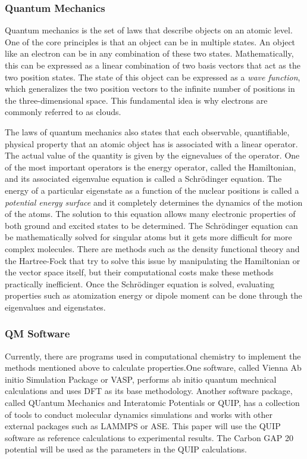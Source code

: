 \documentclass[12pt]{scrartcl}
\begin{document}
\subsubsection{Quantum Mechanics}
Quantum mechanics is the set of laws that describe objects on an atomic level. One of the core
principles is that an object can be in multiple states. An object like an electron can be in any 
combination of these two states. Mathematically, this can be expressed as a linear combination of 
two basis vectors that act as the two position states. The state of this object can be expressed 
as a \emph{wave function}, which generalizes the two position vectors to the infinite number of 
positions in the three-dimensional space. This fundamental idea is why electrons are commonly 
referred to as clouds.

The laws of quantum mechanics also states that each observable, quantifiable, physical property that 
an atomic object has is associated with a linear operator. The actual value of the quantity is given 
by the eignevalues of the operator. One of the most important operators is the energy operator, called 
the Hamiltonian, and its associated eigenvalue equation is called a Schrödinger equation. The energy of 
a particular eigenstate as a function of the nuclear positions is called a \emph{potential energy surface}
and it completely determines the dynamics of the motion of the atoms. The solution to this equation 
allows many electronic properties of both ground and excited states to be determined. The Schrödinger 
equation can be mathematically solved for singular atoms but it gets more difficult for more complex molecules. 
There are methods such as the density functional theory and the Hartree-Fock that try to 
solve this issue by manipulating the Hamiltonian or the vector space itself, but their computational 
costs make these methods practically inefficient. Once the Schrödinger equation is solved, evaluating 
properties such as atomization energy or dipole moment can be done through the eigenvalues and eigenstates.

\subsubsection{QM Software} 
Currently, there are programs used in computational chemistry to implement the methods mentioned above to 
calculate properties.One software, called Vienna Ab initio Simulation Package or VASP, performs ab initio 
quantum mechnical calculations and uses DFT as its base methodology. Another software package, called 
QUantum Mechanics and Interatomic Potentials or QUIP\cite{quip}, has a collection of tools to conduct 
molecular dynamics simulations and works with other external packages such as LAMMPS or ASE. This paper 
will use the QUIP software as reference calculations to experimental results. The Carbon GAP 20 
potential\cite{gap20} will be used as the parameters in the QUIP calculations.
\end{document}
